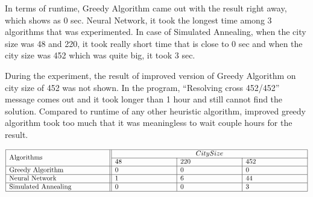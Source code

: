 \documentclass[12pt]{article}
\begin{document}
In terms of runtime, Greedy Algorithm came out with the result right away, which shows as 0 sec. Neural Network, it took the longest time among 3 algorithms that was experimented. In case of Simulated Annealing, when the city size was 48 and 220, it took really short time that is close to 0 sec and when the city size was 452 which was quite big, it took 3 sec. 
\par

During the experiment, the result of improved version of Greedy Algorithm on city size of 452 was not shown. In the program, \enquote{Resolving cross 452/452} message comes out and it took longer than 1 hour and still cannot find the solution. Compared to runtime of any other heuristic algorithm, improved greedy algorithm took too much that it was meaningless to wait couple hours for the result.

\begin{displaymath}
    \begin{array} {|p{5cm}||p{3cm}|p{3cm}|p{3cm}|}
  	  \hline
      \multirow{2}{*}{Algorithms} & \multicolumn{3}{c|}{City Size} \\
      \cline{2-4}
      & 48 & 220 & 452 \\
      \hline
      Greedy Algorithm & 0 & 0 & 0 \\
      \hline
      Neural Network & 1 & 6 & 44 \\
      \hline
      Simulated Annealing & 0 & 0 & 3 \\
      \hline
    \end{array}
  \end{displaymath}
\newpage
\end{document}
